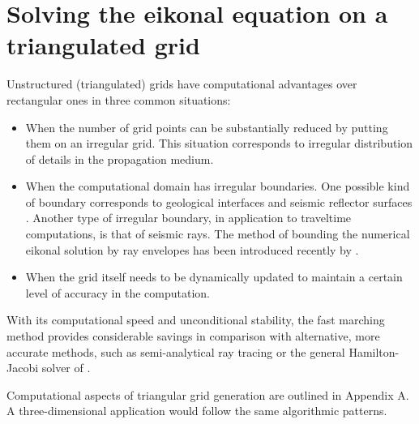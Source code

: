 
\section{Solving the eikonal equation on a triangulated grid}

Unstructured (triangulated) grids have computational advantages over
rectangular ones in three common situations:
 \begin{itemize}
 \item When the number of grid points can be substantially reduced by
   putting them on an irregular grid. This situation corresponds to
   irregular distribution of details in the propagation medium.
 \item When the computational domain has irregular boundaries. One
   possible kind of boundary corresponds to geological interfaces and
   seismic reflector surfaces \cite[]{SEG-1993-0170}. Another type of irregular
   boundary, in application to traveltime computations, is that of
   seismic rays. The method of bounding the numerical eikonal solution
   by ray envelopes has been introduced recently by \cite{SEG-1996-1208}.
 \item When the grid itself needs to be dynamically updated to maintain
   a certain level of accuracy in the computation.
 \end{itemize}
With its computational speed and unconditional stability, the fast
marching method provides considerable savings in comparison with 
alternative, more accurate methods, such as semi-analytical ray
tracing \cite[]{SEG-1991-1497,SEG-1995-1247} or the general Hamilton-Jacobi
solver of \cite{abgrall}.

\par
Computational aspects of triangular grid generation are outlined in
Appendix A. A three-dimensional application would follow the same
algorithmic patterns.

